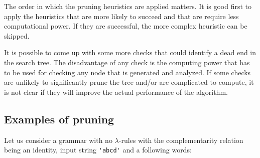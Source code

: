 The order in which the pruning heuristics are applied matters. It is good first to apply the heuristics that are more likely to succeed and that are require less computational power. If they are successful, the more complex heuristic can be skipped.

It is possible to come up with some more checks that could identify a dead end in the search tree. The disadvantage of any check is the computing power that has to be used for checking any node that is generated and analyzed. If some checks are unlikely to significantly prune the tree and/or are complicated to compute, it is not clear if they will improve the actual performance of the algorithm.

\subsection{Examples of pruning}
Let us consider a grammar with no $\lambda$-rules with the complementarity relation being an identity, input string \verb/'abcd'/  and a following words:


